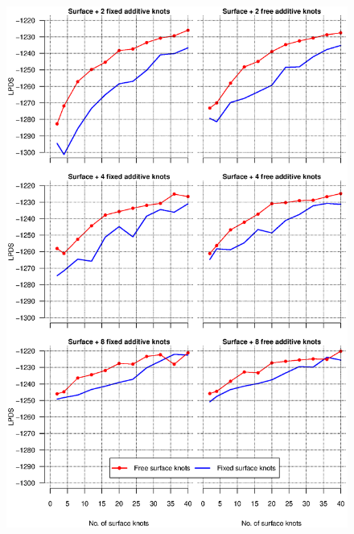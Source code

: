 \documentclass[10pt]{beamer}
\begin{document}
\begin{frame}[plain]
\begin{multicols}{2}
    \begin{center}
      \begin{figure}
        \includegraphics[height=\textheight]{RajanLPDS_SurfacePlusAdditive}
      \end{figure}
    \end{center}
  \end{multicols}
\end{frame}

\end{document}

